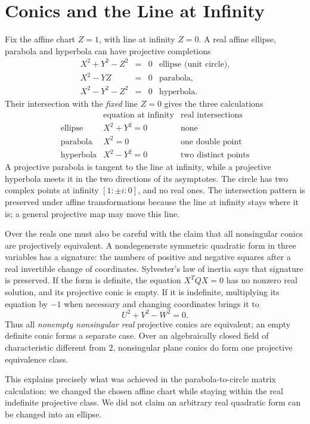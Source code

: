 \section{Conics and the Line at Infinity}

Fix the affine chart $Z=1$, with line at infinity $Z=0$. A real affine ellipse, parabola and hyperbola can have projective completions
\[
 \begin{array}{rcll}
 X^2+Y^2-Z^2&=&0&\text{ellipse (unit circle)},\\
 X^2-YZ&=&0&\text{parabola},\\
 X^2-Y^2-Z^2&=&0&\text{hyperbola}.
 \end{array}
\]
Their intersection with the \emph{fixed} line $Z=0$ gives the three calculations
\[
 \begin{array}{c|c|c}
 &\text{equation at infinity}&\text{real intersections}\\\hline
 \text{ellipse}&X^2+Y^2=0&\text{none}\\
 \text{parabola}&X^2=0&\text{one double point}\\
 \text{hyperbola}&X^2-Y^2=0&\text{two distinct points}
 \end{array}
\]
A projective parabola is tangent to the line at infinity, while a projective hyperbola meets it in the two directions of its asymptotes. The circle has two complex points at infinity $[1:\pm i:0]$, and no real ones. The intersection pattern is preserved under affine transformations because the line at infinity stays where it is; a general projective map may move this line.

Over the reals one must also be careful with the claim that all nonsingular conics are projectively equivalent. A nondegenerate symmetric quadratic form in three variables has a signature: the numbers of positive and negative squares after a real invertible change of coordinates. Sylvester's law of inertia says that signature is preserved. If the form is definite, the equation $X^TQX=0$ has no nonzero real solution, and its projective conic is empty. If it is indefinite, multiplying its equation by $-1$ when necessary and changing coordinates brings it to
\[
 U^2+V^2-W^2=0.
\]
Thus all \emph{nonempty nonsingular real} projective conics are equivalent; an empty definite conic forms a separate case. Over an algebraically closed field of characteristic different from $2$, nonsingular plane conics do form one projective equivalence class.

This explains precisely what was achieved in the parabola-to-circle matrix calculation: we changed the chosen affine chart while staying within the real indefinite projective class. We did not claim an arbitrary real quadratic form can be changed into an ellipse.

